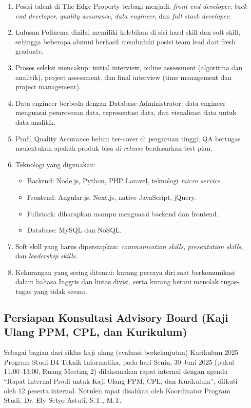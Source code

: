 \begin{enumerate}
\item Posisi talent di The Edge Property terbagi menjadi: \textit{front end developer}, \textit{back end developer}, \textit{quality assurance}, \textit{data engineer}, dan \textit{full stack developer}.
\item Lulusan Polinema dinilai memiliki kelebihan di sisi hard skill dan soft skill, sehingga beberapa alumni berhasil menduduki posisi team lead dari fresh graduate.
\item Proses seleksi mencakup: initial interview, online assessment (algoritma dan analitik), project assessment, dan final interview (time management dan project management).
\item Data engineer berbeda dengan Database Administrator: data engineer menguasai pemrosesan data, representasi data, dan visualisasi data untuk data analitik.
\item Profil Quality Assurance belum ter-cover di perguruan tinggi; QA bertugas menentukan apakah produk bisa di-\textit{release} berdasarkan test plan.
\item Teknologi yang digunakan:
  \begin{itemize}
  \item Backend: Node.js, Python, PHP Laravel, teknologi \textit{micro service}.
  \item Frontend: Angular.js, Next.js, native JavaScript, jQuery.
  \item Fullstack: diharapkan mampu menguasai backend dan frontend.
  \item Database: MySQL dan NoSQL.
  \end{itemize}
\item Soft skill yang harus dipersiapkan: \textit{communication skills}, \textit{presentation skills}, dan \textit{leadership skills}.
\item Kekurangan yang sering ditemui: kurang percaya diri saat berkomunikasi dalam bahasa Inggris dan lintas divisi, serta kurang berani menolak tugas-tugas yang tidak sesuai.
\end{enumerate}

\subsection{Persiapan Konsultasi Advisory Board (Kaji Ulang PPM, CPL, dan Kurikulum)}

Sebagai bagian dari siklus kaji ulang (evaluasi berkelanjutan) Kurikulum 2025 Program Studi D4 Teknik Informatika, pada hari Senin, 30 Juni 2025 (pukul 11.00--13.00, Ruang Meeting 2) dilaksanakan rapat internal dengan agenda ``Rapat Internal Prodi untuk Kaji Ulang PPM, CPL, dan Kurikulum'', diikuti oleh 12 peserta internal. Notulen rapat disahkan oleh Koordinator Program Studi, Dr. Ely Setyo Astuti, S.T., M.T.

